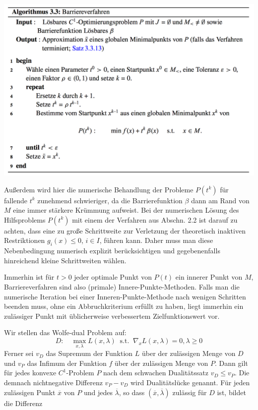 \documentclass[11pt]{scrreprt}
\theoremstyle{thmstyle}
\numberwithin{thm}{section}
\begin{document}
\begin{center}
	\includegraphics[scale=0.475]{img/a33}
\end{center}

Außerdem wird hier die numerische Behandlung der Probleme $P(t^k)$ für fallende $t^k$ zunehmend schwieriger, da die Barrierefunktion $\beta$ dann am Rand von $M$ eine immer stärkere Krümmung aufweist. Bei der numerischen Lösung des Hilfsproblems $P(t^k)$ mit einem der Verfahren aus Abschn. 2.2 ist darauf zu achten, dass eine zu große Schrittweite zur Verletzung der theoretisch inaktiven Restriktionen $g_i(x) \leq 0$, $i \in I$, führen kann. Daher muss man diese Nebenbedingung numerisch explizit berücksichtigen und gegebenenfalls hinreichend kleine Schrittweiten wählen. ~\bigskip

Immerhin ist für $t > 0$ jeder optimale Punkt von $P(t)$ ein innerer Punkt von $M$, Barriereverfahren sind also (primale) Innere-Punkte-Methoden. Falls man die numerische Iteration bei einer Inneren-Punkte-Methode nach wenigen Schritten beenden muss, ohne ein Abbruchkriterium erfüllt zu haben, liegt immerhin ein zulässiger Punkt mit üblicherweise verbessertem Zielfunktionswert vor. ~\bigskip

Wir stellen das Wolfe-dual Problem auf:
	$$ D: \quad \max_{x, \lambda} L(x, \lambda) ~\text{ s.t. }~\nabla_xL(x, \lambda) = 0, \lambda \geq 0 $$
Ferner sei $v_D$ das Supremum der Funktion $L$ über der zulässigen Menge von $D$ und $v_P$ das Infimum der Funktion $f$ über der zulässigen Menge von $P$. Dann gilt für jedes konvexe $C^1$-Problem $P$ nach dem schwachen Dualitätssatz $v_D \leq v_P$. Die demnach nichtnegative Differenz $v_P - v_D$ wird Dualitätslücke genannt.	Für jeden zulässigen Punkt $\overline{x}$ von $P$ und jedes $\overline{\lambda}$, so dass $(\overline{x}, \overline{\lambda})$ zulässig für $D$ ist, bildet die Differenz
\end{document}
